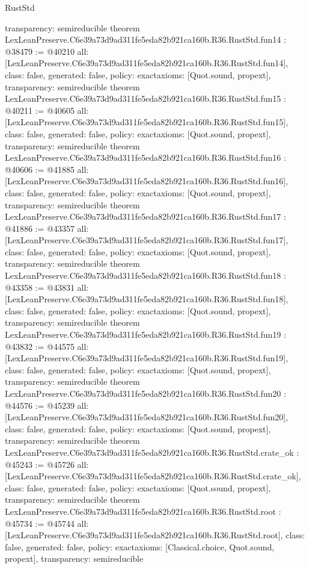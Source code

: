 \begin{lexlean}{RustStd}
\begin{coremodule}
{  transparency: semireducible
}
theorem LexLeanPreserve.C6e39a73d9ad311fe5eda82b921ca160b.R36.RustStd.fun14 : @38479 := @40210 {
  all: [LexLeanPreserve.C6e39a73d9ad311fe5eda82b921ca160b.R36.RustStd.fun14],
  class: false,
  generated: false,
  policy: exact{axioms: [Quot.sound, propext]},
  transparency: semireducible
}
theorem LexLeanPreserve.C6e39a73d9ad311fe5eda82b921ca160b.R36.RustStd.fun15 : @40211 := @40605 {
  all: [LexLeanPreserve.C6e39a73d9ad311fe5eda82b921ca160b.R36.RustStd.fun15],
  class: false,
  generated: false,
  policy: exact{axioms: [Quot.sound, propext]},
  transparency: semireducible
}
theorem LexLeanPreserve.C6e39a73d9ad311fe5eda82b921ca160b.R36.RustStd.fun16 : @40606 := @41885 {
  all: [LexLeanPreserve.C6e39a73d9ad311fe5eda82b921ca160b.R36.RustStd.fun16],
  class: false,
  generated: false,
  policy: exact{axioms: [Quot.sound, propext]},
  transparency: semireducible
}
theorem LexLeanPreserve.C6e39a73d9ad311fe5eda82b921ca160b.R36.RustStd.fun17 : @41886 := @43357 {
  all: [LexLeanPreserve.C6e39a73d9ad311fe5eda82b921ca160b.R36.RustStd.fun17],
  class: false,
  generated: false,
  policy: exact{axioms: [Quot.sound, propext]},
  transparency: semireducible
}
theorem LexLeanPreserve.C6e39a73d9ad311fe5eda82b921ca160b.R36.RustStd.fun18 : @43358 := @43831 {
  all: [LexLeanPreserve.C6e39a73d9ad311fe5eda82b921ca160b.R36.RustStd.fun18],
  class: false,
  generated: false,
  policy: exact{axioms: [Quot.sound, propext]},
  transparency: semireducible
}
theorem LexLeanPreserve.C6e39a73d9ad311fe5eda82b921ca160b.R36.RustStd.fun19 : @43832 := @44575 {
  all: [LexLeanPreserve.C6e39a73d9ad311fe5eda82b921ca160b.R36.RustStd.fun19],
  class: false,
  generated: false,
  policy: exact{axioms: [Quot.sound, propext]},
  transparency: semireducible
}
theorem LexLeanPreserve.C6e39a73d9ad311fe5eda82b921ca160b.R36.RustStd.fun20 : @44576 := @45239 {
  all: [LexLeanPreserve.C6e39a73d9ad311fe5eda82b921ca160b.R36.RustStd.fun20],
  class: false,
  generated: false,
  policy: exact{axioms: [Quot.sound, propext]},
  transparency: semireducible
}
theorem LexLeanPreserve.C6e39a73d9ad311fe5eda82b921ca160b.R36.RustStd.crate_ok : @45243 := @45726 {
  all: [LexLeanPreserve.C6e39a73d9ad311fe5eda82b921ca160b.R36.RustStd.crate_ok],
  class: false,
  generated: false,
  policy: exact{axioms: [Quot.sound, propext]},
  transparency: semireducible
}
theorem LexLeanPreserve.C6e39a73d9ad311fe5eda82b921ca160b.R36.RustStd.root : @45734 := @45744 {
  all: [LexLeanPreserve.C6e39a73d9ad311fe5eda82b921ca160b.R36.RustStd.root],
  class: false,
  generated: false,
  policy: exact{axioms: [Classical.choice, Quot.sound, propext]},
  transparency: semireducible
}


\end{coremodule}
\end{lexlean}

